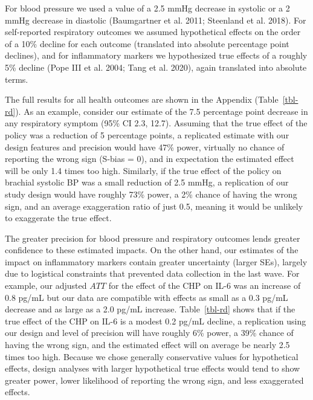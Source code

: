 \documentclass[
  letterpaper,
  DIV=11,
  numbers=noendperiod]{scrartcl}
\begin{document}
For blood pressure we used a value of a 2.5 mmHg decrease in systolic or
a 2 mmHg decrease in diastolic (Baumgartner et al. 2011; Steenland et
al. 2018). For self-reported respiratory outcomes we assumed
hypothetical effects on the order of a 10\% decline for each outcome
(translated into absolute percentage point declines), and for
inflammatory markers we hypothesized true effects of a roughly 5\%
decline (Pope III et al. 2004; Tang et al. 2020), again translated into
absolute terms.

The full results for all health outcomes are shown in the Appendix
(Table~\ref{tbl-rd}). As an example, consider our estimate of the 7.5
percentage point decrease in any respiratory symptom (95\% CI 2.3,
12.7). Assuming that the true effect of the policy was a reduction of 5
percentage points, a replicated estimate with our design features and
precision would have 47\% power, virtually no chance of reporting the
wrong sign (S-bias = 0), and in expectation the estimated effect will be
only 1.4 times too high. Similarly, if the true effect of the policy on
brachial systolic BP was a small reduction of 2.5 mmHg, a replication of
our study design would have roughly 73\% power, a 2\% chance of having
the wrong sign, and an average exaggeration ratio of just 0.5, meaning
it would be unlikely to exaggerate the true effect.

The greater precision for blood pressure and respiratory outcomes lends
greater confidence to these estimated impacts. On the other hand, our
estimates of the impact on inflammatory markers contain
greater uncertainty (larger SEs), largely due to logistical constraints
that prevented data collection in the last wave. For example, our
adjusted \(ATT\) for the effect of the CHP on IL-6 was an increase of
0.8 pg/mL but our data are compatible with effects as small as a 0.3
pg/mL decrease and as large as a 2.0 pg/mL increase. Table~\ref{tbl-rd}
shows that if the true effect of the CHP on IL-6 is a modest 0.2 pg/mL
decline, a replication using our design and level of precision will have
roughly 6\% power, a 39\% chance of having the wrong sign, and the
estimated effect will on average be nearly 2.5 times too high. Because
we chose generally conservative values for hypothetical effects, design
analyses with larger hypothetical true effects would tend to show
greater power, lower likelihood of reporting the wrong sign, and less
exaggerated effects.
\end{document}

